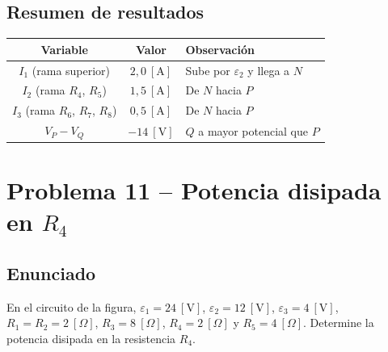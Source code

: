 \documentclass[12pt,letterpaper]{article}
\begin{document}
\subsection*{Resumen de resultados}

\begin{center}
\renewcommand{\arraystretch}{1.2}
\begin{tabular}{|c|c|l|}
\hline
\textbf{Variable} & \textbf{Valor} & \textbf{Observaci\'on} \\
\hline
$I_1$ (rama superior)                 & $2{,}0\ [\text{A}]$ & Sube por $\varepsilon_2$ y llega a $N$ \\
$I_2$ (rama $R_4$, $R_5$)             & $1{,}5\ [\text{A}]$ & De $N$ hacia $P$ \\
$I_3$ (rama $R_6$, $R_7$, $R_8$)      & $0{,}5\ [\text{A}]$ & De $N$ hacia $P$ \\
\hline
$V_P - V_Q$ & $-14\ [\text{V}]$ & $Q$ a mayor potencial que $P$ \\
\hline
\end{tabular}
\end{center}

\newpage

\section*{Problema 11 -- Potencia disipada en $R_4$}

\subsection*{Enunciado}

En el circuito de la figura, $\varepsilon_1 = 24\ [\text{V}]$, $\varepsilon_2 = 12\ [\text{V}]$,
$\varepsilon_3 = 4\ [\text{V}]$, $R_1 = R_2 = 2\ [\Omega]$, $R_3 = 8\ [\Omega]$,
$R_4 = 2\ [\Omega]$ y $R_5 = 4\ [\Omega]$. Determine la potencia disipada en la resistencia $R_4$.
\end{document}
